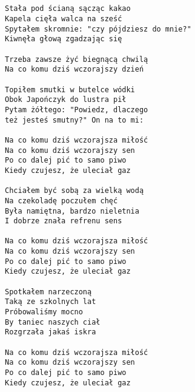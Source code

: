\documentclass[12pt]{article}
\begin{document}
\subsection*{}
\begin{verbatim}
Stała pod ścianą sącząc kakao
Kapela cięła walca na sześć
Spytałem skromnie: "czy pójdziesz do mnie?"
Kiwnęła głową zgadzając się

Trzeba zawsze żyć biegnącą chwilą
Na co komu dziś wczorajszy dzień

Topiłem smutki w butelce wódki
Obok Japończyk do lustra pił
Pytam żółtego: "Powiedz, dlaczego
też jesteś smutny?" On na to mi:

Na co komu dziś wczorajsza miłość
Na co komu dziś wczorajszy sen
Po co dalej pić to samo piwo
Kiedy czujesz, że uleciał gaz

Chciałem być sobą za wielką wodą
Na czekoladę poczułem chęć
Była namiętna, bardzo nieletnia
I dobrze znała refrenu sens

Na co komu dziś wczorajsza miłość
Na co komu dziś wczorajszy sen
Po co dalej pić to samo piwo
Kiedy czujesz, że uleciał gaz

Spotkałem narzeczoną
Taką ze szkolnych lat
Próbowaliśmy mocno
By taniec naszych ciał
Rozgrzała jakaś iskra

Na co komu dziś wczorajsza miłość
Na co komu dziś wczorajszy sen
Po co dalej pić to samo piwo
Kiedy czujesz, że uleciał gaz
\end{verbatim}
\clearpage
\end{document}
